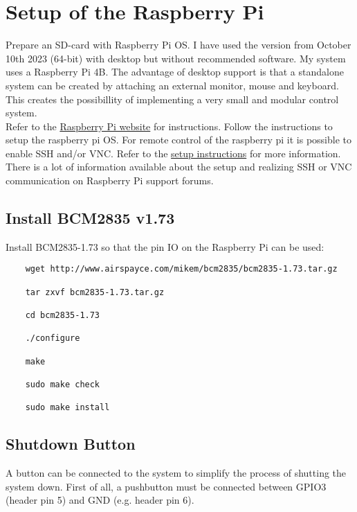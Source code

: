 \section{Setup of the Raspberry Pi}
Prepare an SD-card with Raspberry Pi OS. I have used the version from October 10th 2023 (64-bit) with desktop but without recommended software. My system uses a Raspberry Pi 4B. The advantage of desktop support is that a standalone system can be created by attaching an external monitor, mouse and keyboard. This creates the possibillity of implementing a very small and modular control system.\\

Refer to the \href{https://projects.raspberrypi.org/en/projects/raspberry-pi-setting-up/2}{Raspberry Pi website} for instructions. Follow the instructions to setup the raspberry pi OS. For remote control of the raspberry pi it is possible to enable SSH and/or VNC. Refer to the \href{https://projects.raspberrypi.org/en/projects/raspberry-pi-setting-up/4}{setup instructions} for more information. There is a lot of information available about the setup and realizing SSH or VNC communication on Raspberry Pi support forums.

\subsection{Install BCM2835 v1.73}
Install BCM2835-1.73 so that the pin IO on the Raspberry Pi can be used:
\begin{verbatim}
	wget http://www.airspayce.com/mikem/bcm2835/bcm2835-1.73.tar.gz 
	
	tar zxvf bcm2835-1.73.tar.gz
	
	cd bcm2835-1.73
	
	./configure
	
	make
	
	sudo make check
	
	sudo make install
\end{verbatim}

\subsection{Shutdown Button}


A button can be connected to the system to simplify the process of shutting the system down. First of all, a pushbutton must be connected between GPIO3 (header pin 5) and GND (e.g. header pin 6). \\

